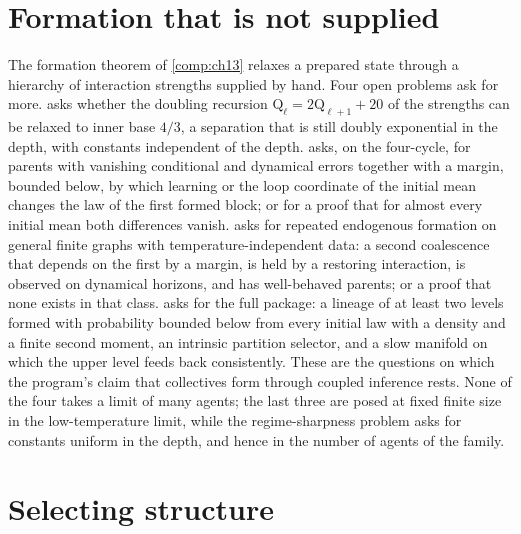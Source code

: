 \section*{Formation that is not supplied}

The formation theorem of \cref{comp:ch13} relaxes a prepared state through a hierarchy of interaction
strengths supplied by hand. Four open problems ask for more. 
asks whether the doubling recursion $\mathrm Q_\ell=2\mathrm Q_{\ell+1}+20$ of the strengths can be
relaxed to inner base $4/3$, a separation that is still doubly exponential in the depth, with constants
independent of the depth.  asks, on the
four-cycle, for parents with vanishing conditional and dynamical errors together with a margin,
bounded below, by which learning or the loop coordinate of the initial mean changes the law of the
first formed block; or for a proof that for almost every initial mean both differences vanish.
 asks for repeated endogenous formation on general finite graphs with
temperature-independent data: a second coalescence that depends on the first by a margin, is held by
a restoring interaction, is observed on dynamical horizons, and has well-behaved parents; or a proof
that none exists in that class.  asks for the full package: a lineage of
at least two levels formed with probability bounded below from every initial law with a density and a finite
second moment, an intrinsic
partition selector, and a slow manifold on which the upper level feeds back consistently. These are
the questions on which the program's claim that collectives form through coupled inference rests.
None of the four takes a limit of many agents; the last three are posed at fixed finite size in the
low-temperature limit, while the regime-sharpness problem asks for constants uniform in the depth,
and hence in the number of agents of the family.

\section*{Selecting structure}

